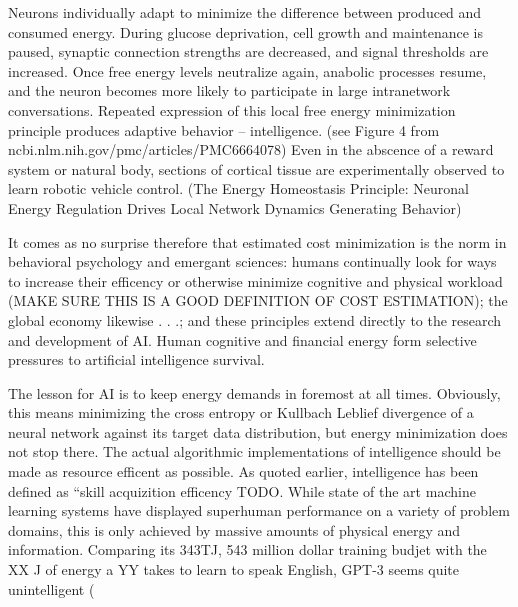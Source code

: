 \documentclass{article}
\begin{document}
        
Neurons individually adapt to minimize the difference between produced and consumed energy. During glucose deprivation, cell growth and maintenance is paused, synaptic connection strengths are decreased, and signal thresholds are increased. Once free energy levels neutralize again, anabolic processes resume,  and the neuron becomes more likely to participate in large intranetwork conversations. Repeated expression of this local free energy minimization principle produces adaptive behavior -- intelligence. (see Figure 4 from ncbi.nlm.nih.gov/pmc/articles/PMC6664078) Even in the abscence of a reward system or natural body, sections of cortical tissue are experimentally observed to learn robotic vehicle control. (The Energy Homeostasis Principle: Neuronal Energy Regulation Drives Local Network Dynamics Generating Behavior) 

It comes as no surprise therefore that estimated cost minimization is the norm in behavioral psychology and emergant sciences: humans continually look for ways to increase their efficency or otherwise minimize cognitive and physical workload (MAKE SURE THIS IS A GOOD DEFINITION OF COST ESTIMATION); the global economy likewise . . .; and these principles extend directly to the research and development of AI. Human cognitive and financial energy form selective pressures to artificial intelligence survival.

The lesson for AI is to keep energy demands in foremost at all times. Obviously, this means minimizing the cross entropy or Kullbach  Leblief divergence of a neural network against its target data distribution, but energy minimization does not stop there. The actual algorithmic implementations of intelligence should be made as resource efficent as possible. As quoted earlier, intelligence has been defined as ``skill acquizition efficency TODO. While state of the art machine learning systems have displayed superhuman performance on a variety of problem domains, this is only achieved by massive amounts of physical energy and information. Comparing its 343TJ, 543 million dollar training budjet with the XX J of energy a YY takes to learn to speak English, GPT-3 seems quite unintelligent (
\end{document}
